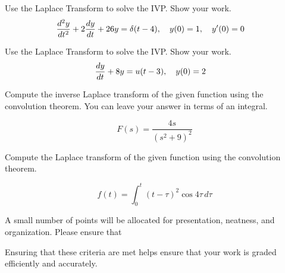 \documentclass[12pt]{exam}
\begin{document}
    


\newpage

\begin{questions}

\question[8] Use the Laplace Transform to solve the IVP. Show your work. %
$${\frac{d ^2y}{dt^2}} + 2{\frac{dy}{dt}} + 26y = \delta(t-4), \quad y(0) = 1, \quad y'(0) = 0\quad $$

\newpage 
\question[7] Use the Laplace Transform to solve the IVP. Show your work. %
$${\frac{dy}{dt}} + 8y = u(t-3), \quad y(0) = 2\quad $$

    
\newpage

    \question[3] Compute the inverse Laplace transform of the given function using the convolution theorem. You can leave your answer in terms of an integral. 
    
    $$F(s) = \frac{4s}{(s^2+9)^2}$$ %
    


\newpage

    \question[1] Compute the Laplace transform of the given function using the convolution theorem. 
    
    $$f(t) = \int_0^t (t - \tau)^2 \cos 4\tau \, d\tau$$ %
    
\newpage     

\question[1] A small number of points will be allocated for presentation, neatness, and organization. Please ensure that
    Ensuring that these criteria are met helps ensure that your work is graded efficiently and accurately. 

\end{questions}
\vspace{2cm}
    
\end{document}

